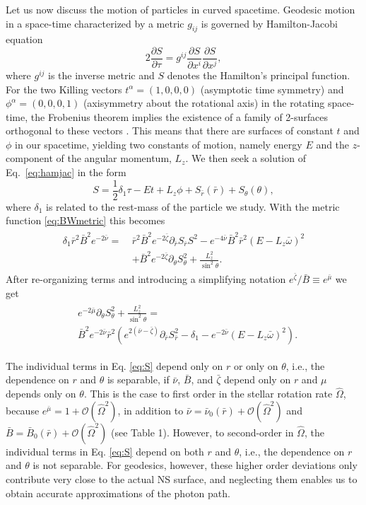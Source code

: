 \documentclass{aa}
\newcommand{\be}{\begin{equation}}
\newcommand{\ee}{\end{equation}}
\newcommand{\refe}[1]{#1}
\newcommand{\pd}{\ensuremath{\partial}} %
\newcommand{\rb}{\ensuremath{\bar{r}}}
\newcommand{\wb}{\ensuremath{\bar{\omega}}}
\newcommand{\Ob}{\ensuremath{\hat{\Omega}}}
\newcommand{\nub}{\ensuremath{\bar{\nu}}}
\newcommand{\zetab}{\ensuremath{\bar{\zeta}}}
\newcommand{\Bb}{\ensuremath{\bar{B}}}
\newcommand{\mub}{\ensuremath{\bar{\mu}}}
\begin{document}
Let us now discuss the motion of particles in curved spacetime.
Geodesic motion in a space-time characterized by a metric $g_{ij}$ is governed by Hamilton-Jacobi equation
\be\label{eq:hamjac}
2\frac{\pd S}{\pd \tau} = g^{ij} \frac{\pd S}{\pd x^i}\frac{\pd S}{\pd x^j},
\ee
where $g^{ij}$ is the inverse metric and $S$ denotes the Hamilton's principal function.
For the two Killing vectors $t^{\alpha} = (1,0,0,0)$ (asymptotic time symmetry) and $\phi^{\alpha} = (0,0,0,1)$ (axisymmetry \refe{about the rotational axis}) in the rotating space-time, the Frobenius theorem implies the existence of a family of 2-surfaces orthogonal to these vectors \citep[see e.g.,][p.12]{rcs}.  
This means that there are surfaces of constant $t$ and $\phi$ in our spacetime, yielding two constants of motion, namely energy $E$ and the $z$-component of the angular momentum, $L_z$.  
We then seek a solution of Eq.~\eqref{eq:hamjac} in the form
\be
S = \frac{1}{2}\delta_1 \tau - Et + L_z\phi + S_{\rb}(\rb) + S_{\theta}(\theta),
\ee
where $\delta_1$ is related to the rest-mass of the particle we study.
With the metric function \eqref{eq:BWmetric} this becomes
\begin{align}\begin{split} 
    \delta_1 \rb^2 \Bb^2 e^{-2\nub} =~& \rb^2 \Bb^2 e^{-2\zetab} \pd_{\rb}S_{\rb}S^2 - e^{-4\nub} \Bb^2 \rb^2 (E - L_z \wb)^2 \\
                                & + \Bb^2 e^{-2\zetab} \pd_{\theta}S_{\theta}^2 + \frac{L_z^2}{\sin^2\theta}.
\end{split}\end{align}
After re-organizing terms and introducing a simplifying notation $e^{\zetab}/\Bb \equiv e^{\mub}$ we get
\begin{align}\begin{split}\label{eq:S}
& e^{-2\mub}\pd_{\theta}S_{\theta}^2 + \frac{L_z^2}{\sin^2\theta} = \\ 
& \Bb^2 e^{-2\nub}\rb^2 ( e^{2(\nub-\zetab)} \pd_{\rb}S_{\rb}^2 -\delta_{1} - e^{-2\nub}(E - L_z \wb)^2 ).
\end{split}\end{align}

\refe{The individual terms in Eq. \eqref{eq:S} depend only on $r$ or only on $\theta$, i.e., the dependence on $r$ and $\theta$ is separable, if $\nub$, $\Bb$, and $\zetab$ depend only on $r$ and $\mu$ depends only on $\theta$. 
This is the case to first order in the stellar rotation rate $\Ob$, because $e^{\mub} = 1 + \mathcal{O}(\Ob^2)$, in addition to $\nub = \nub_0(\rb) + \mathcal{O}(\Ob^2)$ and $\Bb = \Bb_0(\rb) + \mathcal{O}(\Ob^2)$ (see Table 1). 
However, to second-order in $\Ob$, the individual terms in Eq. \eqref{eq:S} depend on both $r$ and $\theta$, i.e., the dependence on $r$ and $\theta$ is not separable.}
For geodesics, however, these higher order deviations only contribute very close to the actual NS surface, and neglecting them enables us to obtain accurate approximations of the photon path.
\end{document}
